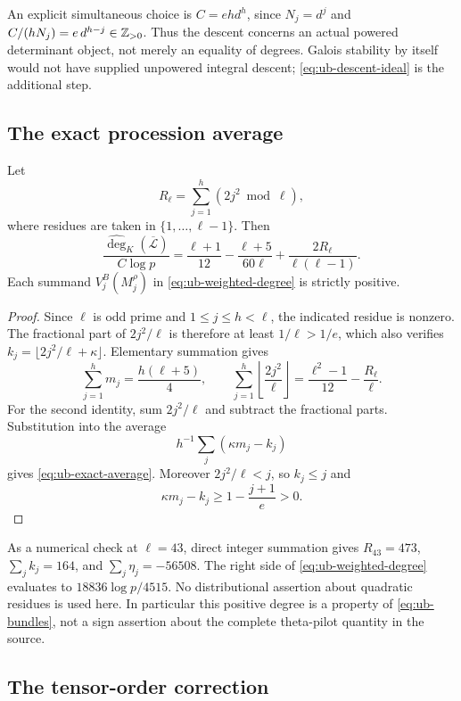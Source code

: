 An explicit simultaneous choice is $C=ehd^h$, since $N_j=d^j$ and
$C/(hN_j)=e\,d^{h-j}\in\mathbb Z_{>0}$. Thus the descent concerns an actual
powered determinant object, not merely an equality of degrees.
Galois stability by itself would not have supplied unpowered
integral descent; \eqref{eq:ub-descent-ideal} is the additional step.

\subsection{The exact procession average}

\begin{proposition}\label{prop:ub-exact-average}
Let
\[
 R_\ell=\sum_{j=1}^h (2j^2\bmod\ell),
\]
where residues are taken in $\{1,\ldots,\ell-1\}$. Then
\begin{equation}\label{eq:ub-exact-average}
 \frac{\widehat{\deg}_K(\overline{\mathcal L})}{C\log p}
 =\frac{\ell+1}{12}-\frac{\ell+5}{60\ell}
        +\frac{2R_\ell}{\ell(\ell-1)}.
\end{equation}
Each summand $V_j^B(M_j^\rho)$ in
\eqref{eq:ub-weighted-degree} is strictly positive.
\end{proposition}

\begin{proof}
Since $\ell$ is odd prime and $1\le j\le h<\ell$, the indicated
residue is nonzero. The fractional part of $2j^2/\ell$ is therefore
at least $1/\ell>1/e$, which also verifies
$k_j=\lfloor2j^2/\ell+\kappa\rfloor$.
Elementary summation gives
\[
 \sum_{j=1}^h m_j=\frac{h(\ell+5)}4,\qquad
 \sum_{j=1}^h\left\lfloor\frac{2j^2}{\ell}\right\rfloor
       =\frac{\ell^2-1}{12}-\frac{R_\ell}{\ell}.
\]
For the second identity, sum $2j^2/\ell$ and subtract the
fractional parts. Substitution into the average
\[
 h^{-1}\sum_j(\kappa m_j-k_j)
\]
gives \eqref{eq:ub-exact-average}. Moreover $2j^2/\ell<j$, so $k_j\le j$
and
\[
 \kappa m_j-k_j\ge1-\frac{j+1}{e}>0.
\]
\end{proof}

As a numerical check at $\ell=43$, direct integer summation gives
$R_{43}=473$, $\sum_jk_j=164$, and $\sum_j\eta_j=-56508$.
The right side of \eqref{eq:ub-weighted-degree} evaluates to
$18836\log p/4515$. No distributional assertion about quadratic
residues is used here. In particular this positive degree is a
property of \eqref{eq:ub-bundles}, not a sign assertion about the
complete theta-pilot quantity in the source.

\subsection{The tensor-order correction}

